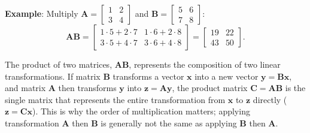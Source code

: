 \begin{exampleBox}
    \textbf{Example}: Multiply $ \mathbf{A} = \begin{bmatrix}1 & 2\\3 & 4\end{bmatrix} $ and $ \mathbf{B} = \begin{bmatrix}5 & 6\\7 & 8\end{bmatrix} $:
    \begin{equation*}
        \mathbf{A}\mathbf{B} = \begin{bmatrix}
            1 \cdot 5 + 2 \cdot 7 & 1 \cdot 6 + 2 \cdot 8 \\
            3 \cdot 5 + 4 \cdot 7 & 3 \cdot 6 + 4 \cdot 8
        \end{bmatrix} = \begin{bmatrix}19 & 22 \\ 43 & 50\end{bmatrix}.
    \end{equation*}
\end{exampleBox}

The product of two matrices, $ \mathbf{A}\mathbf{B} $, represents the composition of two linear transformations. If matrix $ \mathbf{B} $ transforms a vector $ \mathbf{x} $ into a new vector $ \mathbf{y} = \mathbf{B}\mathbf{x} $, and matrix $ \mathbf{A} $ then transforms $ \mathbf{y} $ into $ \mathbf{z} = \mathbf{A}\mathbf{y} $, the product matrix $ \mathbf{C} = \mathbf{A}\mathbf{B} $ is the single matrix that represents the entire transformation from $ \mathbf{x} $ to $ \mathbf{z} $ directly ($ \mathbf{z} = \mathbf{C}\mathbf{x} $). This is why the order of multiplication matters; applying transformation $ \mathbf{A} $ then $ \mathbf{B} $ is generally not the same as applying $ \mathbf{B} $ then $ \mathbf{A} $.

  

